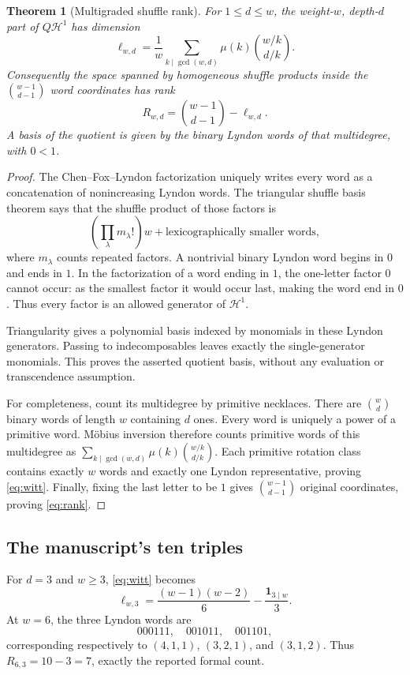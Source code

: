 \documentclass[11pt]{article}
\numberwithin{equation}{section}
\newtheorem{theorem}{Theorem}[section]
\theoremstyle{definition}\newtheorem{definition}[theorem]{Definition}
\theoremstyle{remark}\newtheorem{remark}[theorem]{Remark}
\begin{document}
\begin{theorem}[Multigraded shuffle rank]\label{thm:rank}
For $1\le d\le w$, the weight-$w$, depth-$d$ part of
$Q\mathcal H^1$ has dimension
\begin{equation}\label{eq:witt}
 \ell_{w,d}=\frac1w\sum_{k\mid\gcd(w,d)}
 \mu(k)\binom{w/k}{d/k}.
\end{equation}
Consequently the space spanned by homogeneous shuffle products inside
the $\binom{w-1}{d-1}$ word coordinates has rank
\begin{equation}\label{eq:rank}
 R_{w,d}=\binom{w-1}{d-1}-\ell_{w,d}.
\end{equation}
A basis of the quotient is given by the binary Lyndon words of that
multidegree, with $0<1$.
\end{theorem}
\begin{proof}
The Chen--Fox--Lyndon factorization uniquely writes every word as a
concatenation of nonincreasing Lyndon words. The triangular shuffle
basis theorem \cite{Radford,MelanconReutenauer} says that the shuffle
product of those factors is
\[
 \left(\prod_\lambda m_\lambda!\right)w
    +\text{lexicographically smaller words},
\]
where $m_\lambda$ counts repeated factors.
A nontrivial binary Lyndon word begins in $0$ and ends in $1$.
In the factorization of a word ending in $1$, the one-letter factor
$0$ cannot occur: as the smallest factor it would occur last, making
the word end in $0$. Thus every factor is an allowed generator of
$\mathcal H^1$.

Triangularity gives a polynomial basis indexed by monomials in these
Lyndon generators. Passing to indecomposables leaves exactly the
single-generator monomials. This proves the asserted quotient basis,
without any evaluation or transcendence assumption.

For completeness, count its multidegree by primitive necklaces. There
are $\binom wd$ binary words of length $w$ containing $d$ ones.
Every word is uniquely a power of a primitive word. M\"obius inversion
therefore counts primitive words of this multidegree as
$\sum_{k\mid\gcd(w,d)}\mu(k)\binom{w/k}{d/k}$.
Each primitive rotation class contains exactly $w$ words and exactly
one Lyndon representative, proving \eqref{eq:witt}.
Finally, fixing the last letter to be $1$ gives
$\binom{w-1}{d-1}$ original coordinates, proving \eqref{eq:rank}.
\end{proof}

\subsection{The manuscript's ten triples}
For $d=3$ and $w\ge3$, \eqref{eq:witt} becomes
\begin{equation}\label{eq:triplecount}
 \ell_{w,3}=\frac{(w-1)(w-2)}6-\frac{\mathbf1_{3\mid w}}3.
\end{equation}
At $w=6$, the three Lyndon words are
\[
 000111,\quad001011,\quad001101,
\]
corresponding respectively to $(4,1,1)$, $(3,2,1)$, and $(3,1,2)$.
Thus $R_{6,3}=10-3=7$, exactly the reported formal count.
\end{document}

